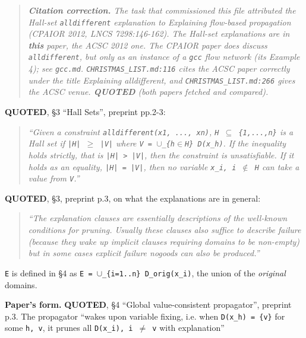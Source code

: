 \documentclass[10pt,a4paper]{article}
\newcommand{\provtag}[2]{{\small\sffamily\bfseries\textcolor{#1}{#2}}}
\newenvironment{pubblock}{%
  \par\smallskip
  \def\FrameCommand{\textcolor{litbar}{\vrule width 2.5pt}\hspace{9pt}}%
  \MakeFramed{\advance\hsize-\width\FrameRestore}}%
  {\endMakeFramed\par\smallskip}
\newcommand{\litsub}[1]{\par\smallskip{\sffamily\bfseries\textcolor{litbar}{#1}\par}}
\begin{document}
\begin{pubblock}
\begin{quotation}\small\itshape
\textbf{Citation correction.} The task that commissioned this file attributed the Hall-set \texttt{alldifferent} explanation to \emph{Explaining flow-based propagation} (CPAIOR 2012, LNCS 7298:146-162). The Hall-set explanations are in \textbf{this} paper, the ACSC 2012 one. The CPAIOR paper does discuss \texttt{alldifferent}, but only as an instance of a \texttt{gcc} flow network (its Example 4); see \texttt{gcc.md}. \texttt{CHRISTMAS\_LIST.md:116} cites the ACSC paper correctly under the title \emph{Explaining alldifferent}, and \texttt{CHRISTMAS\_LIST.md:266} gives the ACSC venue. \provtag{tagquoted}{QUOTED} (both papers fetched and compared).
\end{quotation}
\par\smallskip
\litsub{The paper's own vocabulary}
\provtag{tagquoted}{QUOTED}, \S{}3 ``Hall Sets'', preprint pp.2-3:

\begin{quotation}\small\itshape
``Given a constraint \texttt{alldifferent(x1, .\allowbreak{}.\allowbreak{}.\allowbreak{}, xn)}, \texttt{H $\subseteq$ \{1,...,n\}} is a Hall set if \texttt{|H| $\geq$ |V|} where \texttt{V = $\cup$\_\{h$\in$H\} D(x\_h)}. If the inequality holds strictly, that is \texttt{|H| > |V|}, then the constraint is unsatisfiable. If it holds as an equality, \texttt{|H| = |V|}, then no variable \texttt{x\_i, i $\notin$ H} can take a value from \texttt{V}.''
\end{quotation}
\provtag{tagquoted}{QUOTED}, \S{}3, preprint p.3, on what the explanations are in general:

\begin{quotation}\small\itshape
``The explanation clauses are essentially descriptions of the well-known conditions for pruning. Usually these clauses also suffice to describe failure (because they wake up implicit clauses requiring domains to be non-empty) but in some cases explicit failure nogoods can also be produced.''
\end{quotation}
\texttt{E} is defined in \S{}4 as \texttt{E = $\cup$\_\allowbreak{}\{i=1.\allowbreak{}.\allowbreak{}n\} D\_\allowbreak{}orig(x\_\allowbreak{}i)}, the union of the \emph{original} domains.

\par\smallskip
\litsub{Rule 1 --- value-consistent (forward-checking) propagator}
\textbf{Paper's form.} \provtag{tagquoted}{QUOTED}, \S{}4 ``Global value-consistent propagator'', preprint p.3. The propagator ``wakes upon variable fixing, i.e. when \texttt{D(x\_h) = \{v\}} for some \texttt{h, v}, it prunes all \texttt{D(x\_i), i $\neq$ v} with explanation''


\end{pubblock}
\end{document}
